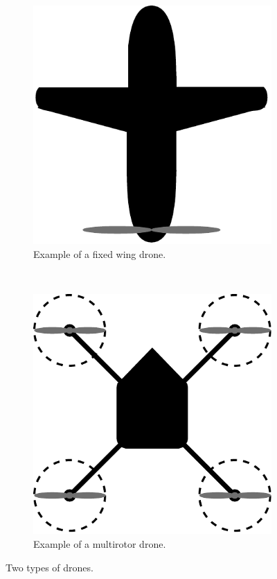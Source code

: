 \begin{figure}[h]
\centering
    \begin{subfigure}[h]{0.35\textwidth}
        \includegraphics[width=\textwidth]{figures/PA/Fixedwing.pdf}
        \caption{Example of a fixed wing drone.}
        \label{fig:fixedwing}
    \end{subfigure}
    ~
    \begin{subfigure}[h]{0.35\textwidth}
        \includegraphics[width=\textwidth]{figures/PA/Quadcopter.pdf}
        \caption{Example of a multirotor drone.}
        \label{fig:multirotor}
    \end{subfigure}
    \caption{Two types of drones.}
    \label{fig:drones_type}
\end{figure}

